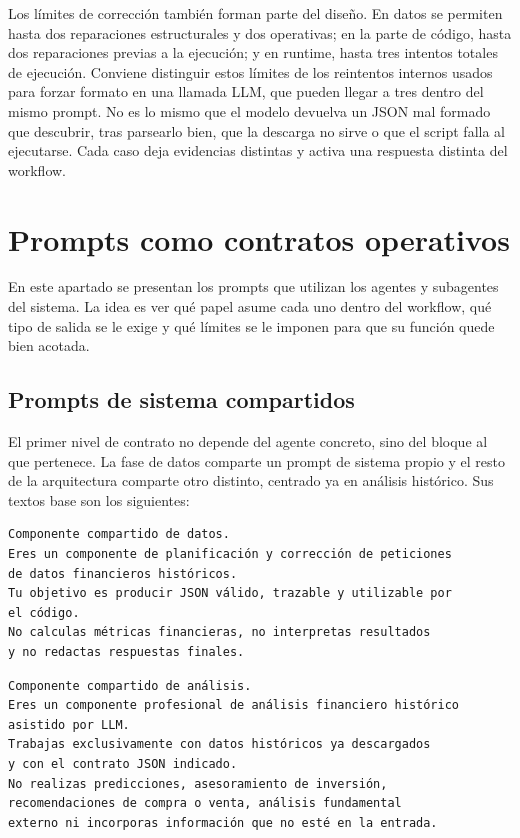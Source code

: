Los l\'imites de correcci\'on tambi\'en forman parte del dise\~no. En datos se permiten hasta dos reparaciones estructurales y dos operativas; en la parte de
c\'odigo, hasta dos reparaciones previas a la ejecuci\'on; y en runtime, hasta tres intentos totales de ejecuci\'on. Conviene distinguir estos l\'imites de los
reintentos internos usados para forzar formato en una llamada LLM, que pueden llegar a tres dentro del mismo prompt. No es lo mismo que el modelo devuelva un
JSON mal formado que descubrir, tras parsearlo bien, que la descarga no sirve o que el script falla al ejecutarse. Cada caso deja evidencias distintas y activa
una respuesta distinta del workflow.

\section{Prompts como contratos operativos}

En este apartado se presentan los prompts que utilizan los agentes y subagentes del sistema. La idea es ver qu\'e papel asume cada uno dentro del
workflow, qu\'e tipo de salida se le exige y qu\'e l\'imites se le imponen para que su funci\'on quede bien acotada.

\subsection{Prompts de sistema compartidos}

El primer nivel de contrato no depende del agente concreto, sino del bloque al que pertenece. La fase de datos comparte un prompt de sistema propio y el resto
de la arquitectura comparte otro distinto, centrado ya en an\'alisis hist\'orico. Sus textos base son los siguientes:

\begin{lstlisting}[style=promptblock]
Componente compartido de datos.
Eres un componente de planificación y corrección de peticiones
de datos financieros históricos.
Tu objetivo es producir JSON válido, trazable y utilizable por
el código.
No calculas métricas financieras, no interpretas resultados
y no redactas respuestas finales.
\end{lstlisting}

\begin{lstlisting}[style=promptblock]
Componente compartido de análisis.
Eres un componente profesional de análisis financiero histórico
asistido por LLM.
Trabajas exclusivamente con datos históricos ya descargados
y con el contrato JSON indicado.
No realizas predicciones, asesoramiento de inversión,
recomendaciones de compra o venta, análisis fundamental
externo ni incorporas información que no esté en la entrada.
\end{lstlisting}


